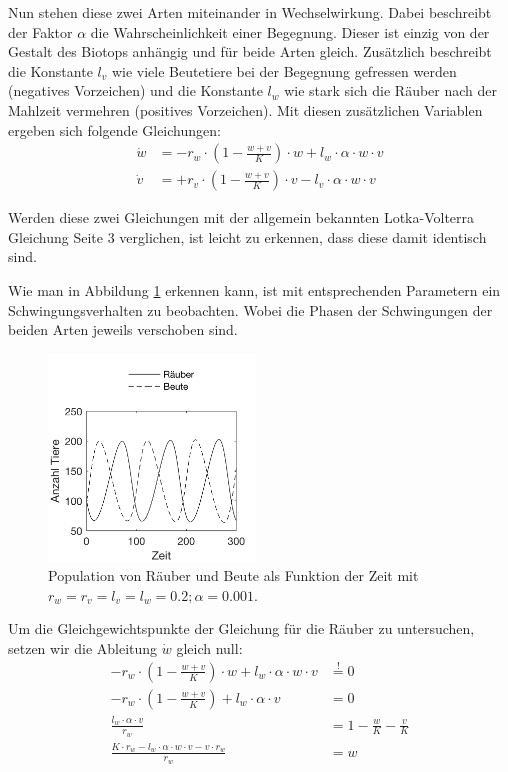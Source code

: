 \documentclass[a4paper,twoside]{article}
\begin{document}
	\newpage

	Nun stehen diese zwei Arten miteinander in Wechselwirkung. Dabei beschreibt der Faktor \(\alpha\) die Wahrscheinlichkeit einer Begegnung. Dieser ist einzig von der Gestalt des Biotops anhängig und für beide Arten gleich. Zusätzlich beschreibt die Konstante \(l_{v}\) wie viele Beutetiere bei der Begegnung gefressen werden (negatives Vorzeichen) und die Konstante \(l_{w}\) wie stark sich die Räuber nach der Mahlzeit vermehren (positives Vorzeichen). Mit diesen zusätzlichen Variablen ergeben sich folgende Gleichungen:
	 \begin{align*}
		\dot{w} &= -r_w \cdot \left(1 - \frac{w+v}{K} \right) \cdot w + l_w \cdot \alpha \cdot w \cdot v \\
		\dot{v} &= +r_v \cdot \left(1 - \frac{w+v}{K} \right) \cdot v - l_v \cdot \alpha \cdot w \cdot v
	\end{align*}

	Werden diese zwei Gleichungen mit der allgemein bekannten Lotka-Volterra Gleichung \cite{PredatorPrey} Seite 3 verglichen, ist leicht zu erkennen, dass diese damit identisch sind.

	Wie man in Abbildung \ref{fig:beute_raeuber_oszillation} erkennen kann, ist mit entsprechenden Parametern ein Schwingungsverhalten zu beobachten. Wobei die Phasen der Schwingungen der beiden Arten jeweils verschoben sind.
	
	\begin{figure}[!h]
  		\centering
 		\includegraphics[width=5.5cm]{Diagramme/beute_raeuber_oszillation.png}
  		\caption{Population von Räuber und Beute als Funktion der Zeit mit \(r_w = r_v = l_v = l_w = 0.2; \alpha = 0.001\).}
  		\label{fig:beute_raeuber_oszillation}
	\end{figure}
	
	Um die Gleichgewichtspunkte der Gleichung für die Räuber zu untersuchen, setzen wir die Ableitung \(\dot{w}\) gleich null:
	\begin{align*}
		-r_w \cdot \left(1 - \frac{w+v}{K} \right) \cdot w + l_w \cdot \alpha \cdot w \cdot v &\stackrel{!}{=} 0\\
		-r_w \cdot \left(1 - \frac{w+v}{K} \right) + l_w \cdot \alpha \cdot v &= 0\\
		\frac{l_w \cdot \alpha \cdot v}{r_w} &= 1 - \frac{w}{K}-\frac{v}{K}\\
		\frac{K \cdot r_w - l_w \cdot \alpha \cdot w \cdot v - v \cdot r_w}{r_w} &= w
	\end{align*}
	
\end{document}
